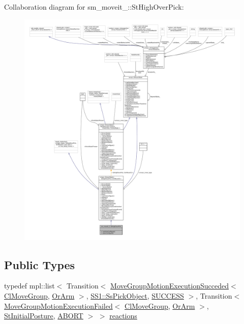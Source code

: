 Collaboration diagram for sm\+\_\+moveit\+\_\+:\+:St\+High\+Over\+Pick\+:
\nopagebreak
\begin{figure}[H]
\begin{center}
\leavevmode
\includegraphics[width=350pt]{structsm__moveit__3_1_1StHighOverPick__coll__graph}
\end{center}
\end{figure}
\subsection*{Public Types}
\begin{DoxyCompactItemize}
\item 
typedef mpl\+::list$<$ Transition$<$ \hyperlink{structmoveit__z__client_1_1MoveGroupMotionExecutionSucceded}{Move\+Group\+Motion\+Execution\+Succeded}$<$ \hyperlink{classmoveit__z__client_1_1ClMoveGroup}{Cl\+Move\+Group}, \hyperlink{classsm__moveit__3_1_1OrArm}{Or\+Arm} $>$, \hyperlink{structsm__moveit__3_1_1SS1_1_1SsPickObject}{S\+S1\+::\+Ss\+Pick\+Object}, \hyperlink{classSUCCESS}{S\+U\+C\+C\+E\+SS} $>$, Transition$<$ \hyperlink{structmoveit__z__client_1_1MoveGroupMotionExecutionFailed}{Move\+Group\+Motion\+Execution\+Failed}$<$ \hyperlink{classmoveit__z__client_1_1ClMoveGroup}{Cl\+Move\+Group}, \hyperlink{classsm__moveit__3_1_1OrArm}{Or\+Arm} $>$, \hyperlink{structsm__moveit__3_1_1StInitialPosture}{St\+Initial\+Posture}, \hyperlink{classABORT}{A\+B\+O\+RT} $>$ $>$ \hyperlink{structsm__moveit__3_1_1StHighOverPick_a0ff9cdee9431fa286043ed34356f7ce3}{reactions}
\end{DoxyCompactItemize}
